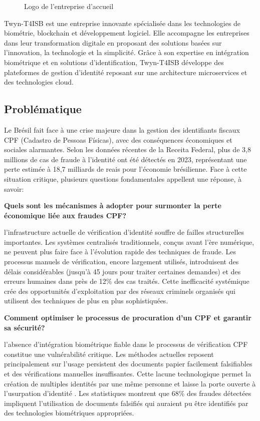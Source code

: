 
\begin{figure}[H]
\centering
{} %
\caption{Logo de l'entreprise d'accueil }
\label{fig:1-1-company-logo}
\end{figure}

Twyn-T4ISB est une entreprise innovante spécialisée dans les technologies de biométrie, blockchain et développement logiciel. Elle accompagne les entreprises dans leur transformation digitale en proposant des solutions basées sur l'innovation, la technologie et la simplicité. Grâce à son expertise en intégration biométrique et en solutions d'identification, Twyn-T4ISB développe des plateformes de gestion d'identité reposant sur une architecture microservices et des technologies cloud.\\



\subsection{Problématique}
Le Brésil fait face à une crise majeure dans la gestion des identifiants fiscaux CPF (Cadastro de Pessoas Físicas), avec des conséquences économiques et sociales alarmantes. Selon les données récentes de la Receita Federal, plus de 3,8 millions de cas de fraude à l'identité ont été détectés en 2023, représentant une perte estimée à 18,7 milliards de reais pour l'économie brésilienne. Face à cette situation critique, plusieurs questions fondamentales appellent une réponse, à savoir:

\textbf{Quels sont les mécanismes à adopter pour surmonter la perte économique liée aux fraudes CPF?}
\item l'infrastructure actuelle de vérification d'identité souffre de failles structurelles importantes. Les systèmes centralisés traditionnels, conçus avant l'ère numérique, ne peuvent plus faire face à l'évolution rapide des techniques de fraude. Les processus manuels de vérification, encore largement utilisés, introduisent des délais considérables (jusqu'à 45 jours pour traiter certaines demandes) et des erreurs humaines dans près de 12\% des cas traités. Cette inefficacité systémique crée des opportunités d'exploitation par des réseaux criminels organisés qui utilisent des techniques de plus en plus sophistiquées.

\textbf{Comment optimiser le processus de procuration d'un CPF et garantir sa sécurité?}
\item l'absence d'intégration biométrique fiable dans le processus de vérification CPF constitue une vulnérabilité critique. Les méthodes actuelles reposent principalement sur l'usage persistent des documents papier facilement falsifiables et des vérifications manuelles insuffisantes. Cette lacune technologique permet la création de multiples identités par une même personne et laisse la porte ouverte à l'usurpation d'identité . Les statistiques montrent que 68\% des fraudes détectées impliquent l'utilisation de documents falsifiés qui auraient pu être identifiés par des technologies biométriques appropriées.

